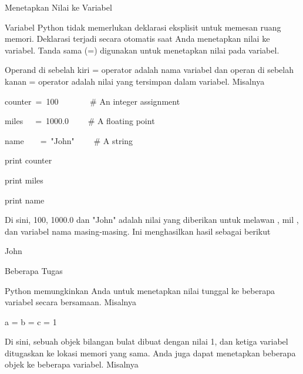 

\vspace{12pt}
\noindent 
Menetapkan Nilai ke Variabel \par
\vspace{12pt}
\noindent 
Variabel Python tidak memerlukan deklarasi eksplisit untuk memesan ruang memori. $  $Deklarasi terjadi secara otomatis saat Anda menetapkan nilai ke variabel. $  $Tanda sama (=) digunakan untuk menetapkan nilai pada variabel. \par
\vspace{12pt}
\noindent 
Operand di sebelah kiri = operator adalah nama variabel dan operan di sebelah kanan = operator adalah nilai yang tersimpan dalam variabel. $  $Misalnya  \par
\vspace{12pt}
\noindent 
counter~=~100~~~~~~~    $  \#  $ An integer assignment \par
\noindent 
miles~~~=~1000.0~~~~    $  \#  $ A floating point \par
\noindent 
name~~~~=~"John"~~~~    $  \#  $ A string \par
\vspace{12pt}
\noindent 
print counter \par
\noindent 
print miles \par
\noindent 
print name \par
\vspace{12pt}
\noindent 
Di sini, 100, 1000.0 dan "John" adalah nilai yang diberikan untuk $  $melawan $  $, $  $mil $  $, dan $  $variabel $  $nama $  $masing-masing. $  $Ini menghasilkan hasil sebagai berikut  \par
\vspace{12pt}
 \par
{} \par
\noindent 
John \par
\vspace{12pt}
\noindent 
Beberapa Tugas \par
\noindent 
Python memungkinkan Anda untuk menetapkan nilai tunggal ke beberapa variabel secara bersamaan. $  $Misalnya  \par
\vspace{12pt}
\noindent 
a = b = c = 1 \par
\vspace{12pt}
\noindent 
Di sini, sebuah objek bilangan bulat dibuat dengan nilai 1, dan ketiga variabel ditugaskan ke lokasi memori yang sama. $  $Anda juga dapat menetapkan beberapa objek ke beberapa variabel. $  $Misalnya  \par
